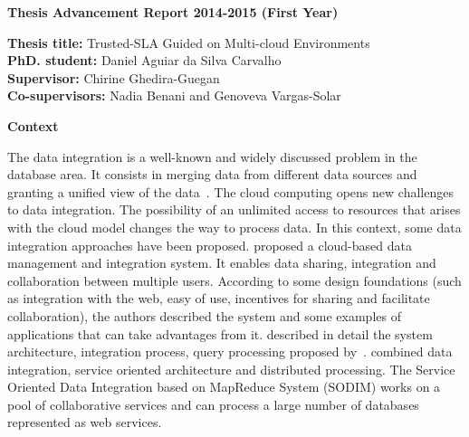 \documentclass[12pt,a4paper,oneside]{report}
\author{Daniel Aguiar da Silva Carvalho}
\begin{document}
\sffamily
\begin{center}
\textbf{\large{Thesis Advancement Report 2014-2015 (First Year)}}
\end{center}

\begin{flushleft}
\textbf{Thesis title:} Trusted-SLA Guided on Multi-cloud Environments \\
\textbf{PhD. student:} Daniel Aguiar da Silva Carvalho \\
\textbf{Supervisor:} Chirine Ghedira-Guegan \\ 
\textbf{Co-supervisors:} Nadia Benani and Genoveva Vargas-Solar
\end{flushleft}


\begin{flushleft}
\textbf{Context}\\
\end{flushleft} 

The data integration is a well-known and widely discussed problem in the database area. 
It consists in merging data from different data sources and granting a unified view of the data~\cite{Lenzerini:2002}. 
The cloud computing opens new challenges to data integration. 
The possibility of an unlimited access to resources that arises with the cloud model changes the way to process data.
In this context, some data integration approaches have been proposed.
\cite{Gonzalez:2010b} proposed a cloud-based data management and integration system.
It enables data sharing, integration and collaboration between multiple users. 
According to some design foundations (such as integration with the web, easy of use, incentives for sharing and facilitate collaboration), the authors described the system  and some examples of applications that can take advantages from it. 
\cite{Gonzalez:2010} described in detail the system architecture, integration process, query processing proposed by~\cite{Gonzalez:2010b}. 
\cite{078} combined data integration, service oriented architecture and distributed processing. 
The Service Oriented Data Integration based on MapReduce System (SODIM) works on a pool of collaborative services and can process a large number of databases represented as web services. 

%
\end{document}
